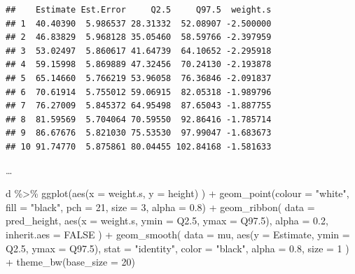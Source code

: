 \documentclass[
  a4paper,11pt,twoside,onecolumn,openright,final,oldfontcommands]{memoir}
\newenvironment{Shaded}{\begin{snugshade}}{\end{snugshade}}
\newcommand{\AttributeTok}[1]{\textcolor[rgb]{0.77,0.63,0.00}{#1}}
\newcommand{\ConstantTok}[1]{\textcolor[rgb]{0.00,0.00,0.00}{#1}}
\newcommand{\DecValTok}[1]{\textcolor[rgb]{0.00,0.00,0.81}{#1}}
\newcommand{\FloatTok}[1]{\textcolor[rgb]{0.00,0.00,0.81}{#1}}
\newcommand{\FunctionTok}[1]{\textcolor[rgb]{0.00,0.00,0.00}{#1}}
\newcommand{\NormalTok}[1]{#1}
\newcommand{\SpecialCharTok}[1]{\textcolor[rgb]{0.00,0.00,0.00}{#1}}
\newcommand{\StringTok}[1]{\textcolor[rgb]{0.31,0.60,0.02}{#1}}
\theoremstyle{definition}
\theoremstyle{definition}
\theoremstyle{definition}
\theoremstyle{definition}
\theoremstyle{remark}
\begin{document}
\begin{verbatim}
##    Estimate Est.Error     Q2.5     Q97.5  weight.s
## 1  40.40390  5.986537 28.31332  52.08907 -2.500000
## 2  46.83829  5.968128 35.05460  58.59766 -2.397959
## 3  53.02497  5.860617 41.64739  64.10652 -2.295918
## 4  59.15998  5.869889 47.32456  70.24130 -2.193878
## 5  65.14660  5.766219 53.96058  76.36846 -2.091837
## 6  70.61914  5.755012 59.06915  82.05318 -1.989796
## 7  76.27009  5.845372 64.95498  87.65043 -1.887755
## 8  81.59569  5.704064 70.59550  92.86416 -1.785714
## 9  86.67676  5.821030 75.53530  97.99047 -1.683673
## 10 91.74770  5.875861 80.04455 102.84168 -1.581633
\end{verbatim}

\ldots{}

\begin{Shaded}
\begin{Highlighting}[]
\NormalTok{d }\SpecialCharTok{\%\textgreater{}\%}
  \FunctionTok{ggplot}\NormalTok{(}\FunctionTok{aes}\NormalTok{(}\AttributeTok{x =}\NormalTok{ weight.s, }\AttributeTok{y =}\NormalTok{ height) ) }\SpecialCharTok{+}
  \FunctionTok{geom\_point}\NormalTok{(}\AttributeTok{colour =} \StringTok{"white"}\NormalTok{, }\AttributeTok{fill =} \StringTok{"black"}\NormalTok{, }\AttributeTok{pch =} \DecValTok{21}\NormalTok{, }\AttributeTok{size =} \DecValTok{3}\NormalTok{, }\AttributeTok{alpha =} \FloatTok{0.8}\NormalTok{) }\SpecialCharTok{+}
  \FunctionTok{geom\_ribbon}\NormalTok{(}
    \AttributeTok{data =}\NormalTok{ pred\_height, }\FunctionTok{aes}\NormalTok{(}\AttributeTok{x =}\NormalTok{ weight.s, }\AttributeTok{ymin =}\NormalTok{ Q2}\FloatTok{.5}\NormalTok{, }\AttributeTok{ymax =}\NormalTok{ Q97}\FloatTok{.5}\NormalTok{),}
    \AttributeTok{alpha =} \FloatTok{0.2}\NormalTok{, }\AttributeTok{inherit.aes =} \ConstantTok{FALSE}
\NormalTok{    ) }\SpecialCharTok{+}
  \FunctionTok{geom\_smooth}\NormalTok{(}
    \AttributeTok{data =}\NormalTok{ mu, }\FunctionTok{aes}\NormalTok{(}\AttributeTok{y =}\NormalTok{ Estimate, }\AttributeTok{ymin =}\NormalTok{ Q2}\FloatTok{.5}\NormalTok{, }\AttributeTok{ymax =}\NormalTok{ Q97}\FloatTok{.5}\NormalTok{),}
    \AttributeTok{stat =} \StringTok{"identity"}\NormalTok{, }\AttributeTok{color =} \StringTok{"black"}\NormalTok{, }\AttributeTok{alpha =} \FloatTok{0.8}\NormalTok{, }\AttributeTok{size =} \DecValTok{1}
\NormalTok{    ) }\SpecialCharTok{+}
  \FunctionTok{theme\_bw}\NormalTok{(}\AttributeTok{base\_size =} \DecValTok{20}\NormalTok{)}
\end{Highlighting}
\end{Shaded}
\end{document}
